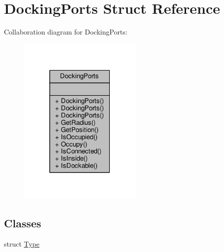 \hypertarget{structDockingPorts}{}\section{Docking\+Ports Struct Reference}
\label{structDockingPorts}


Collaboration diagram for Docking\+Ports\+:
\nopagebreak
\begin{figure}[H]
\begin{center}
\leavevmode
\includegraphics[width=171pt]{d1/d51/structDockingPorts__coll__graph}
\end{center}
\end{figure}
\subsection*{Classes}
\begin{DoxyCompactItemize}
\item 
struct \hyperlink{structDockingPorts_1_1Type}{Type}
\end{DoxyCompactItemize}
